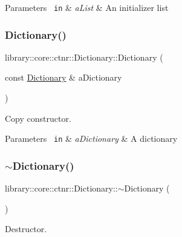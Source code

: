 \begin{DoxyParams}[1]{Parameters}
\mbox{\texttt{ in}}  & {\em a\+List} & An initializer list \\
\hline
\end{DoxyParams}
\mbox{\label{classlibrary_1_1core_1_1ctnr_1_1_dictionary_a17e09d0a01799ed41cb6dfe9cf7dd52c}} 
\subsubsection{\texorpdfstring{Dictionary()}{Dictionary()}\hspace{0.1cm}{\footnotesize\ttfamily [2/2]}}
{\footnotesize\ttfamily library\+::core\+::ctnr\+::\+Dictionary\+::\+Dictionary (\begin{DoxyParamCaption}\item[{const \mbox{\hyperlink{classlibrary_1_1core_1_1ctnr_1_1_dictionary}{Dictionary}} \&}]{a\+Dictionary }\end{DoxyParamCaption})}



Copy constructor. 


\begin{DoxyParams}[1]{Parameters}
\mbox{\texttt{ in}}  & {\em a\+Dictionary} & A dictionary \\
\hline
\end{DoxyParams}
\mbox{\label{classlibrary_1_1core_1_1ctnr_1_1_dictionary_a4b06c3b334776cb177aa3423bce0afaa}} 
\subsubsection{\texorpdfstring{$\sim$Dictionary()}{~Dictionary()}}
{\footnotesize\ttfamily library\+::core\+::ctnr\+::\+Dictionary\+::$\sim$\+Dictionary (\begin{DoxyParamCaption}{ }\end{DoxyParamCaption})}



Destructor. 



